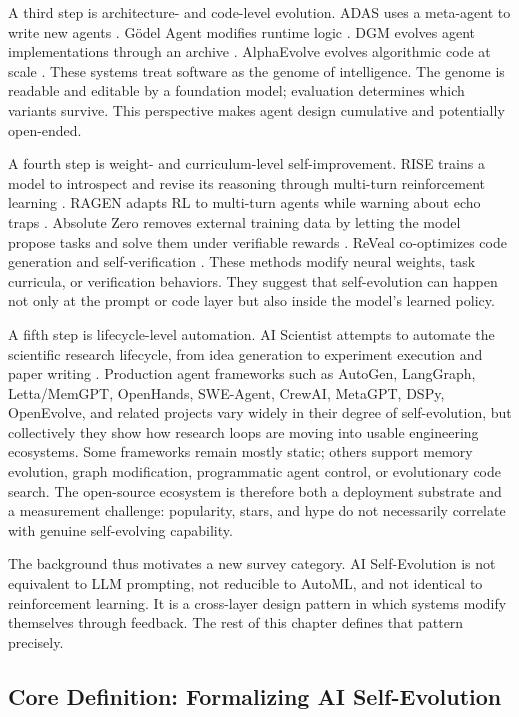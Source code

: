 A third step is architecture- and code-level evolution. ADAS uses a meta-agent to write new agents \cite{adas2025}. G{\"o}del Agent modifies runtime logic \cite{yin2024godel}. DGM evolves agent implementations through an archive \cite{darwingodelmachine2025}. AlphaEvolve evolves algorithmic code at scale \cite{alphaevolve2025}. These systems treat software as the genome of intelligence. The genome is readable and editable by a foundation model; evaluation determines which variants survive. This perspective makes agent design cumulative and potentially open-ended.

A fourth step is weight- and curriculum-level self-improvement. RISE trains a model to introspect and revise its reasoning through multi-turn reinforcement learning \cite{qu2024rise}. RAGEN adapts RL to multi-turn agents while warning about echo traps \cite{wang2025ragen}. Absolute Zero removes external training data by letting the model propose tasks and solve them under verifiable rewards \cite{absolutezero2025}. ReVeal co-optimizes code generation and self-verification \cite{reveal2025}. These methods modify neural weights, task curricula, or verification behaviors. They suggest that self-evolution can happen not only at the prompt or code layer but also inside the model's learned policy.

A fifth step is lifecycle-level automation. AI Scientist attempts to automate the scientific research lifecycle, from idea generation to experiment execution and paper writing \cite{aiscientist2024}. Production agent frameworks such as AutoGen, LangGraph, Letta/MemGPT, OpenHands, SWE-Agent, CrewAI, MetaGPT, DSPy, OpenEvolve, and related projects vary widely in their degree of self-evolution, but collectively they show how research loops are moving into usable engineering ecosystems. Some frameworks remain mostly static; others support memory evolution, graph modification, programmatic agent control, or evolutionary code search. The open-source ecosystem is therefore both a deployment substrate and a measurement challenge: popularity, stars, and hype do not necessarily correlate with genuine self-evolving capability.

The background thus motivates a new survey category. AI Self-Evolution is not equivalent to LLM prompting, not reducible to AutoML, and not identical to reinforcement learning. It is a cross-layer design pattern in which systems modify themselves through feedback. The rest of this chapter defines that pattern precisely.

\subsection{Core Definition: Formalizing AI Self-Evolution}
\label{subsec:intro-definition}

